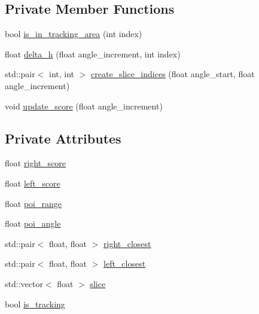 \subsection*{Private Member Functions}
\begin{DoxyCompactItemize}
\item 
bool \hyperlink{class_scanner__gestures_a8239d96119dc8c87737774dcb786d5d4}{is\+\_\+in\+\_\+tracking\+\_\+area} (int index)
\item 
float \hyperlink{class_scanner__gestures_afb846c8368b20e533e283fda2af2962e}{delta\+\_\+h} (float angle\+\_\+increment, int index)
\item 
std\+::pair$<$ int, int $>$ \hyperlink{class_scanner__gestures_a46c81fb4179dda97e52e83323d6f6f93}{create\+\_\+slice\+\_\+indices} (float angle\+\_\+start, float angle\+\_\+increment)
\item 
void \hyperlink{class_scanner__gestures_add7d6045dd42c8a7409f7100ced6e27d}{update\+\_\+score} (float angle\+\_\+increment)
\end{DoxyCompactItemize}
\subsection*{Private Attributes}
\begin{DoxyCompactItemize}
\item 
float \hyperlink{class_scanner__gestures_ac70d55167bb745213abadfb06a615e91}{right\+\_\+score}
\item 
float \hyperlink{class_scanner__gestures_a42ac1f24eee3f92065743f0a23452dd5}{left\+\_\+score}
\item 
float \hyperlink{class_scanner__gestures_a55694caa26cbfbc83f349a11a15a6980}{poi\+\_\+range}
\item 
float \hyperlink{class_scanner__gestures_a191a5090d123ef3ab2f3ae7e7c83c59b}{poi\+\_\+angle}
\item 
std\+::pair$<$ float, float $>$ \hyperlink{class_scanner__gestures_ad51010037fec39cc18a5ccd23bb52d02}{right\+\_\+closest}
\item 
std\+::pair$<$ float, float $>$ \hyperlink{class_scanner__gestures_aaa7bab014f2c47eab1314c5dd6a5c25e}{left\+\_\+closest}
\item 
std\+::vector$<$ float $>$ \hyperlink{class_scanner__gestures_af41d7e1707fce466c71119a52999913a}{slice}
\item 
bool \hyperlink{class_scanner__gestures_a31783191e1afd1ab1e9c295aa243b6ac}{is\+\_\+tracking}
\end{DoxyCompactItemize}


